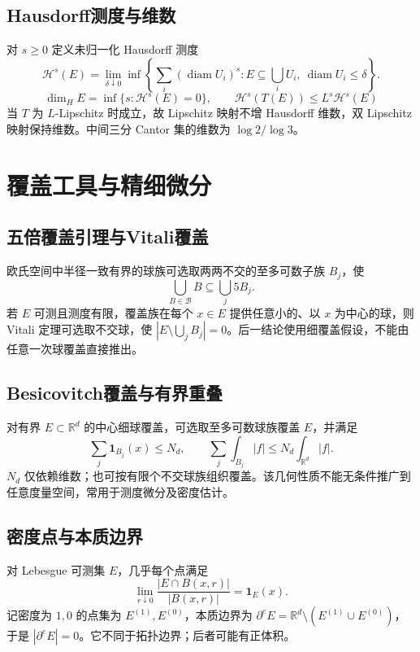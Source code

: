 \documentclass[../main.tex]{subfiles}
\begin{document}
\subsection{Hausdorff测度与维数}
对 $s\ge0$ 定义未归一化 Hausdorff 测度
\[
\mathcal H^s(E)=\lim_{\delta\downarrow0}\inf\left\{\sum_i(\operatorname{diam}U_i)^s:
E\subseteq\bigcup_iU_i,\ \operatorname{diam}U_i\le\delta\right\}.
\]
\[
\dim_HE=\inf\{s:\mathcal H^s(E)=0\},\qquad
\mathcal H^s(T(E))\le L^s\mathcal H^s(E)
\]
当 $T$ 为 $L$-Lipschitz 时成立，故 Lipschitz 映射不增 Hausdorff 维数，双 Lipschitz 映射保持维数。中间三分 Cantor 集的维数为 $\log2/\log3$。
\section{覆盖工具与精细微分}\label{sec:ra-covering}
\subsection{五倍覆盖引理与Vitali覆盖}
欧氏空间中半径一致有界的球族可选取两两不交的至多可数子族 $B_j$，使
\[
\bigcup_{B\in\mathcal B}B\subseteq\bigcup_j5B_j.
\]
若 $E$ 可测且测度有限，覆盖族在每个 $x\in E$ 提供任意小的、以 $x$ 为中心的球，则 Vitali 定理可选取不交球，使 $|E\setminus\bigcup_jB_j|=0$。后一结论使用细覆盖假设，不能由任意一次球覆盖直接推出。
\subsection{Besicovitch覆盖与有界重叠}
对有界 $E\subset\mathbb R^d$ 的中心细球覆盖，可选取至多可数球族覆盖 $E$，并满足
\[
\sum_j\bm1_{B_j}(x)\le N_d,
\qquad \sum_j\int_{B_j}|f|\le N_d\int_{\mathbb R^d}|f|.
\]
$N_d$ 仅依赖维数；也可按有限个不交球族组织覆盖。该几何性质不能无条件推广到任意度量空间，常用于测度微分及密度估计。
\subsection{密度点与本质边界}
对 Lebesgue 可测集 $E$，几乎每个点满足
\[
\lim_{r\downarrow0}\frac{|E\cap B(x,r)|}{|B(x,r)|}=\bm1_E(x).
\]
记密度为 $1,0$ 的点集为 $E^{(1)},E^{(0)}$，本质边界为 $\partial^eE=\mathbb R^d\setminus(E^{(1)}\cup E^{(0)})$，于是 $|\partial^eE|=0$。它不同于拓扑边界；后者可能有正体积。
\end{document}
